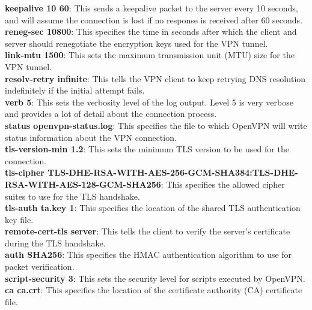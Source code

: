 \documentclass[12pt]{article}
\begin{document}
\textbf{keepalive 10 60}: This sends a keepalive packet to the server every 10 seconds, and will assume the connection is lost if no response is received after 60 seconds.\\

\textbf{reneg-sec 10800}: This specifies the time in seconds after which the client and server should renegotiate the encryption keys used for the VPN tunnel.\\


\textbf{link-mtu 1500}: This sets the maximum transmission unit (MTU) size for the VPN tunnel.\\

\textbf{resolv-retry infinite}: This tells the VPN client to keep retrying DNS resolution indefinitely if the initial attempt fails.\\

\textbf{verb 5}: This sets the verbosity level of the log output. Level 5 is very verbose and provides a lot of detail about the connection process.\\

\textbf{status openvpn-status.log}: This specifies the file to which OpenVPN will write status information about the VPN connection.\\

\textbf{tls-version-min 1.2}: This sets the minimum TLS version to be used for the connection.\\

\textbf{tls-cipher TLS-DHE-RSA-WITH-AES-256-GCM-SHA384:TLS-DHE-RSA-WITH-AES-128-GCM-SHA256}: This specifies the allowed cipher suites to use for the TLS handshake.\\

\textbf{tls-auth ta.key 1}: This specifies the location of the shared TLS authentication key file.\\

\textbf{remote-cert-tls server}: This tells the client to verify the server's certificate during the TLS handshake.\\

\textbf{auth SHA256}: This specifies the HMAC authentication algorithm to use for packet verification.\\

\textbf{script-security 3}: This sets the security level for scripts executed by OpenVPN.\\

\textbf{ca ca.crt}: This specifies the location of the certificate authority (CA) certificate file.\\
\end{document}
